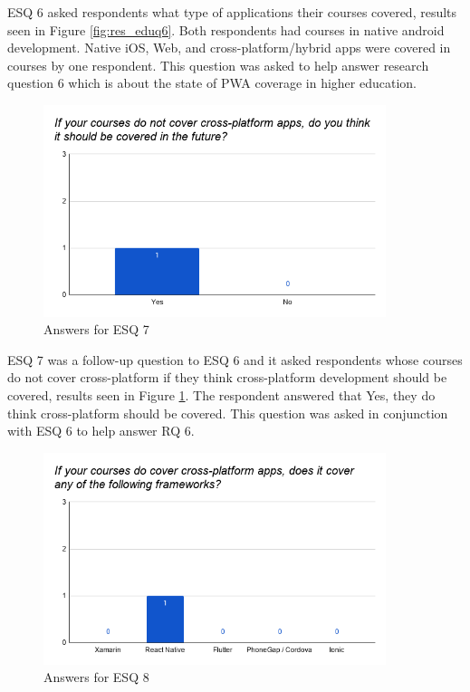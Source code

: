 \documentclass[a4paper,12pt]{article}
\begin{document}
\newpage
ESQ 6 asked respondents what type of applications their courses covered, results seen in Figure \ref{fig:res_eduq6}. Both respondents had courses in native android development. Native iOS, Web, and cross-platform/hybrid apps were covered in courses by one respondent. This question was asked to help answer research question 6 which is about the state of PWA coverage in higher education.

\begin{figure}[ht!]
    \centering
    \includegraphics[width=10cm]{img/Results/esq7.png}
    \caption{Answers for ESQ 7}
    \label{fig:res_eduq7}
\end{figure}

ESQ 7 was a follow-up question to ESQ 6 and it asked respondents whose courses do not cover cross-platform if they think cross-platform development should be covered, results seen in Figure \ref{fig:res_eduq7}. The respondent answered that Yes, they do think cross-platform should be covered. This question was asked in conjunction with ESQ 6 to help answer RQ 6.

\begin{figure}[ht!]
    \centering
    \includegraphics[width=10cm]{img/Results/esq8.png}
    \caption{Answers for ESQ 8}
    \label{fig:res_eduq8}
\end{figure}
\end{document}

